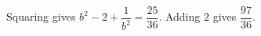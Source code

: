 Squaring gives $ b^2-2+\dfrac{1}{b^2}=\dfrac{25}{36}$. Adding $ 2 $ gives $\boxed{\dfrac{97}{36}}$.

